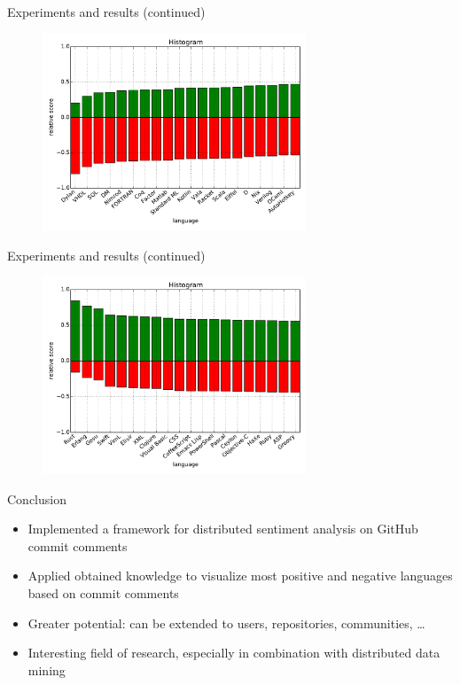 \documentclass[t,11pt]{beamer}
\begin{document}
\begin{frame}[fragile]{Experiments and results (continued)}
  \begin{figure}
    \centering
    \includegraphics[width=0.7\textwidth]{../plots/all-group-neg.pdf}
  \end{figure}
\end{frame}

\begin{frame}[fragile]{Experiments and results (continued)}
  \begin{figure}
    \centering
    \includegraphics[width=0.7\textwidth]{../plots/all-group-pos.pdf}
  \end{figure}
\end{frame}

\begin{frame}[fragile]{Conclusion}
\begin{itemize}
  \item Implemented a framework for distributed sentiment analysis on
        GitHub commit comments
  \item Applied obtained knowledge to visualize most positive and
        negative languages based on commit comments
  \item Greater potential: can be extended to users, repositories,
        communities, \ldots
  \item Interesting field of research, especially in combination with
        distributed data mining
\end{itemize}
\end{frame}
\end{document}
